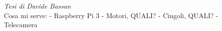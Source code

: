 \textit{Tesi di Davide Bassan}\\

Cosa mi serve:
    - Raspberry Pi 3
    - Motori, QUALI?
    - Cingoli, QUALI?
    - Telecamera
